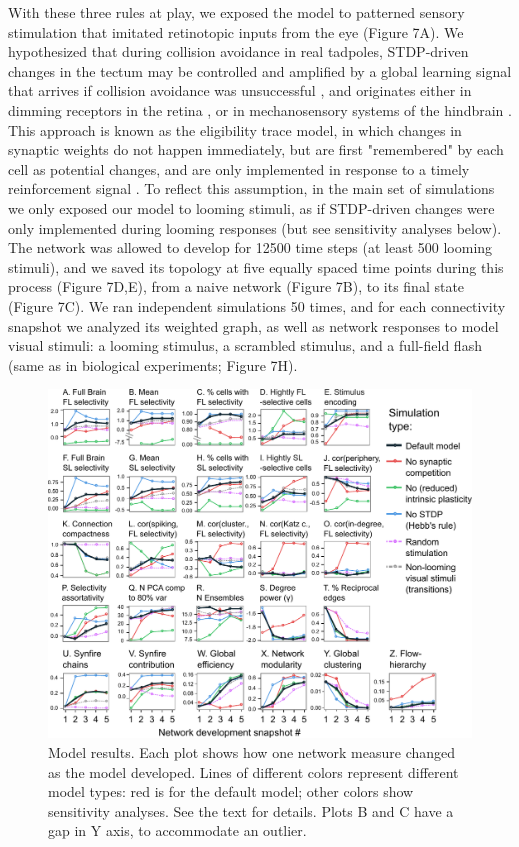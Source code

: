 \documentclass{article}
\begin{document}
With these three rules at play, we exposed the model to patterned sensory stimulation that imitated retinotopic inputs from the eye (Figure 7A). We hypothesized that during collision avoidance in real tadpoles, STDP-driven changes in the tectum may be controlled and amplified by a global learning signal that arrives if collision avoidance was unsuccessful \citep{savin2014stdpreward, aswolinskiy2015stdpreward}, and originates either in dimming receptors in the retina \citep{baranauskas2012}, or in mechanosensory systems of the hindbrain \citep{pratt2009multisens, felch2016, truszkowski2017}. This approach is known as the eligibility trace model, in which changes in synaptic weights do not happen immediately, but are first "remembered" by each cell as potential changes, and are only implemented in response to a timely reinforcement signal \citep{seung2003trace}. To reflect this assumption, in the main set of simulations we only exposed our model to looming stimuli, as if STDP-driven changes were only implemented during looming responses (but see sensitivity analyses below). The network was allowed to develop for 12500 time steps (at least 500 looming stimuli), and we saved its topology at five equally spaced time points during this process (Figure 7D,E), from a naive network (Figure 7B), to its final state (Figure 7C). We ran independent simulations 50 times, and for each connectivity snapshot we analyzed its weighted graph, as well as network responses to model visual stimuli: a looming stimulus, a scrambled stimulus, and a full-field flash (same as in biological experiments; Figure 7H).

\begin{figure}[t!]
\includegraphics[width=\linewidth]{fig8.pdf}
\caption{
Model results. Each plot shows how one network measure changed as the model developed. Lines of different colors represent different model types: red is for the default model; other colors show sensitivity analyses. See the text for details. Plots B and C have a gap in Y axis, to accommodate an outlier. }
\end{figure}
\end{document}
